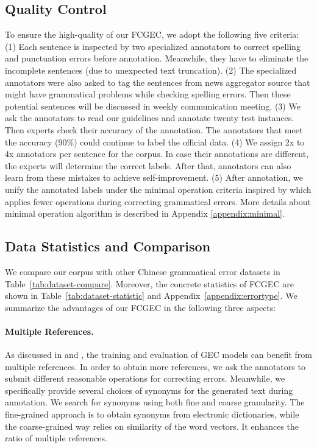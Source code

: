 \documentclass[11pt]{article}
\begin{document}
\subsection{Quality Control}
\label{sec:data-quality}

To ensure the high-quality of our FCGEC, we adopt the following five criteria: (1) Each sentence is inspected by two specialized annotators to correct spelling and punctuation errors before annotation. Meanwhile, they have to eliminate the incomplete sentences (due to unexpected text truncation). (2) The specialized annotators were also asked to tag the sentences from news aggregator source that might have grammatical problems while checking spelling errors. Then these potential sentences will be discussed in weekly communication meeting. (3) We ask the annotators to read our guidelines and annotate twenty test instances. Then experts check their accuracy of the annotation. The annotators that meet the accuracy (90\%) could continue to label the official data. (4) We assign 2x to 4x annotators per sentence for the corpus. In case their annotations are different, the experts will determine the correct labels. After that, annotators can also learn from these mistakes to achieve self-improvement. (5) After annotation, we unify the annotated labels under the minimal operation criteria inspired by \citet{dahlmeier2012better} which applies fewer operations during correcting grammatical errors. More details about minimal operation algorithm is described in Appendix \ref{appendix:minimal}.


\subsection{Data Statistics and Comparison}

We compare our corpus with other Chinese grammatical error datasets in Table~\ref{tab:dataset-compare}. Moreover, the concrete statistics of FCGEC are shown in Table~\ref{tab:dataset-statistic} and Appendix~\ref{appendix:errortype}. We summarize the advantages of our FCGEC in the following three aspects:

\paragraph{Multiple References.}
As discussed in \citet{bryant2015far} and \citet{zhang2022mucgec}, the training and evaluation of GEC models can benefit from multiple references. In order to obtain more references, we ask the annotators to submit different reasonable operations for correcting errors. Meanwhile, we specifically provide several choices of synonyms for the generated text during annotation. We search for synonyms using both fine and coarse granularity. The fine-grained approach is to obtain synonyms from electronic dictionaries, while the coarse-grained way relies on similarity of the word vectors. It enhances the ratio of multiple references.
\end{document}
